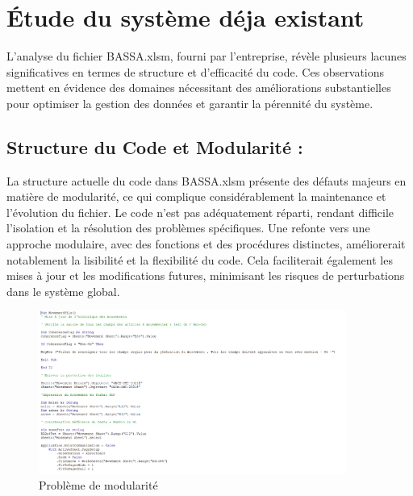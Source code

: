 \documentclass[a4paper, oneside, 12pt, final]{extreport}
\begin{document}
\section{Étude du système déja existant}
L'analyse du fichier BASSA.xlsm, fourni par l'entreprise, révèle plusieurs lacunes significatives en termes de structure et d'efficacité du code. Ces observations mettent en évidence des domaines nécessitant des améliorations substantielles pour optimiser la gestion des données et garantir la pérennité du système.

\subsection{Structure du Code et Modularité :}
La structure actuelle du code dans BASSA.xlsm présente des défauts majeurs en matière de modularité, ce qui complique considérablement la maintenance et l'évolution du fichier. Le code n'est pas adéquatement réparti, rendant difficile l'isolation et la résolution des problèmes spécifiques. Une refonte vers une approche modulaire, avec des fonctions et des procédures distinctes, améliorerait notablement la lisibilité et la flexibilité du code. Cela faciliterait également les mises à jour et les modifications futures, minimisant les risques de perturbations dans le système global.
\begin{figure}[h]
    \centering
    \includegraphics[width=0.9\textwidth]{Capture1.png} %
    \caption{Problème de modularité}
    \label{fig:Problème de modularité}
\end{figure}
\end{document}
